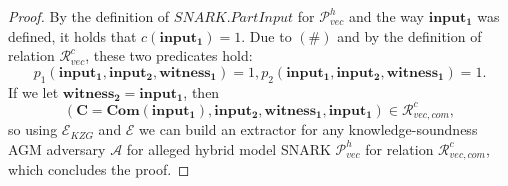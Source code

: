 \begin{proof}
\noindent By the definition of $\mathit{SNARK.PartInput}$ for $\mathscr{P}_{\mathit{vec}}^{h}$ and the way $\mathbf{input_1}$ was defined, 
it holds that $c(\mathbf{input_1}) = 1$. Due to $(\#)$ and by the definition of relation $\mathcal{R}_{\mathit{vec}}^{c}$, 
these two predicates hold: $$p_1(\mathbf{input_1}, \mathbf{input_2}, \mathbf{witness_1}) = 1, 
p_2(\mathbf{input_1}, \mathbf{input_2}, \mathbf{witness_1}) = 1.$$ If we let 
$\mathbf{witness_2} = \mathbf{input_1}$, then 
$$(\mathbf{C} = \mathbf{Com}(\mathbf{input_1}), \mathbf{input_2}, \mathbf{witness_1}, \mathbf{input_1}) \in \mathcal{R}_{\mathit{vec}, \mathit{com}}^c,$$ so 
using $\mathcal{E}_{\mathit{KZG}}$ and $\mathcal{E}$ we can build an extractor for any knowledge-soundness AGM adversary $\mathcal{A}$ for alleged 
hybrid model SNARK $\mathscr{P}_{\mathit{vec}}^{h}$ for relation $\mathcal{R}_{\mathit{vec}, \mathit{com}}^c$, which concludes the proof.
\end{proof}